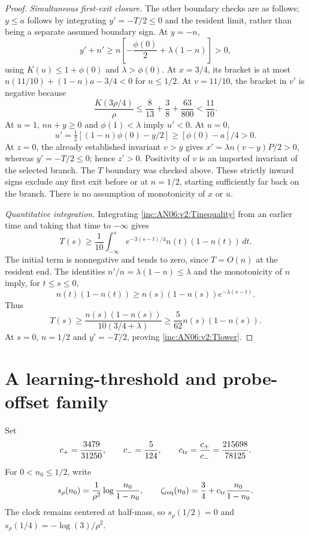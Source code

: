 \documentclass[11pt]{article}
\numberwithin{equation}{section}
\theoremstyle{remark}\newtheorem{remark}[theorem]{Remark}
\newcommand{\1}{\mathbf 1}
\begin{document}
\begin{proof}
\emph{Simultaneous first-exit closure.}
The other boundary checks are as follows; $y\le a$ follows by integrating
$y'=-T/2\le0$ and the resident limit, rather than being a separate assumed
boundary sign.
At $y=-n$,
\[
 y'+n'\ge n\left[-\frac{\phi(0)}2+\lambda(1-n)\right]>0,
\]
using $K(u)\le1+\phi(0)$ and $\lambda>\phi(0)$.
At $x=3/4$, its bracket is at most
$n(11/10)+(1-n)a-3/4<0$ for $n\le1/2$.
At $v=11/10$, the bracket in $v'$ is negative because
\[
 \frac{K(3\rho/4)}\rho
 \le\frac{8}{13}+\frac38+\frac{63}{800}<\frac{11}{10}.
\]
At $u=1$, $nu+y\ge0$ and $\phi(1)<\lambda$ imply $u'<0$.
At $u=0$,
\[
 u'=\tfrac12[(1-n)\phi(0)-y/2]\ge[\phi(0)-a]/4>0.
\]
At $z=0$, the already established invariant $v>y$ gives
$x'=\lambda n(v-y)P/2>0$, whereas $y'=-T/2\le0$; hence $z'>0$.
Positivity of $v$ is an imported invariant of the selected branch.
The $T$ boundary was checked above. These strictly inward signs exclude
any first exit before or at $n=1/2$, starting sufficiently far back on the
branch. There is no assumption of monotonicity of $x$ or $u$.

\emph{Quantitative integration.}
Integrating \eqref{inc:AN06:v2:Tinequality} from an earlier time and taking
that time to $-\infty$ gives
\[
 T(s)\ge\frac1{10}\int_{-\infty}^s
 e^{-3(s-t)/4}n(t)(1-n(t))\,dt.
\]
The initial term is nonnegative and tends to zero, since $T=O(n)$ at the
resident end. The identities $n'/n=\lambda(1-n)\le\lambda$ and the
monotonicity of $n$ imply, for $t\le s\le0$,
\[
 n(t)(1-n(t))\ge n(s)(1-n(s))e^{-\lambda(s-t)}.
\]
Thus
\[
 T(s)\ge\frac{n(s)(1-n(s))}{10(3/4+\lambda)}
 \ge\frac5{62}n(s)(1-n(s)).
\]
At $s=0$, $n=1/2$ and $y'=-T/2$, proving
\eqref{inc:AN06:v2:Tlower}.
\end{proof}

\section{A learning-threshold and probe-offset family}
\label{inc:AN06:v2:descentfamily}
Set
\begin{equation}\label{inc:AN06:v2:tradeoffconstants}
 c_+=\frac{3479}{31250},\qquad c_-=\frac5{124},\qquad
 c_{\rm tr}=\frac{c_+}{c_-}=\frac{215698}{78125}.
\end{equation}
For $0<n_0\le1/2$, write
\[
 s_\rho(n_0)=\frac1{\rho^2}\log\frac{n_0}{1-n_0},\qquad
 \zeta_{\rm req}(n_0)=\frac34+c_{\rm tr}\frac{n_0}{1-n_0}.
\]
The clock remains centered at half-mass, so $s_\rho(1/2)=0$ and
$s_\rho(1/4)=-\log(3)/\rho^2$.
\end{document}
